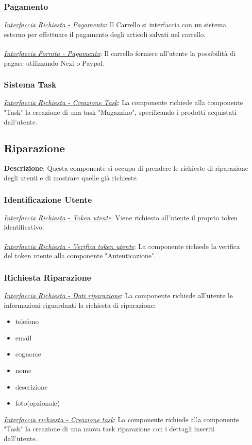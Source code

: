 \documentclass{report}
\begin{document}
\subsubsection*{\indent \indent Pagamento}
\uline{\textit{Interfaccia Richiesta - Pagamento}}:
Il Carrello si interfaccia con un sistema esterno per effettuare il pagamento degli articoli salvati nel carrello.\\\\
\uline{\textit{Interfaccia Fornita - Pagamento}}:
Il carrello fornisce all'utente la possibilità di pagare utilizzando Nexi o Paypal.
\subsubsection*{\indent \indent Sistema Task}
\uline{\textit{Interfaccia Richiesta - Creazione Task}}:
La componente richiede alla componente "Task" la creazione di una task "Magazzino", specificando i prodotti acquistati dall'utente.
\subsection*{Riparazione}
\textbf{Descrizione}: Questa componente si occupa di prendere le richieste di riparazione degli utenti e di mostrare quelle già richieste.
\subsubsection*{\indent \indent Identificazione Utente}
\uline{\textit{Interfaccia Richiesta - Token utente}}: 
Viene richiesto all'utente il proprio token identificativo.\\\\
\uline{\textit{Interfaccia Richiesta - Verifica token utente}}:
La componente richiede la verifica del token utente alla componente "Autenticazione".
\subsubsection*{\indent \indent Richiesta Riparazione}
\uline{\textit{Interfaccia Richiesta - Dati riparazione}}:
La componente richiede all'utente le informazioni riguardanti la richiesta di riparazione:
\begin{itemize}
	\item telefono
	\item email
	\item cognome
	\item nome
	\item descrizione
	\item foto(opzionale)
\end{itemize}
\uline{\textit{Interfaccia richiesta - Creazione task}}: 
La componente richiede alla componente "Task" la creazione di una nuova task riparazione con i dettagli inseriti dall'utente.
\end{document}
